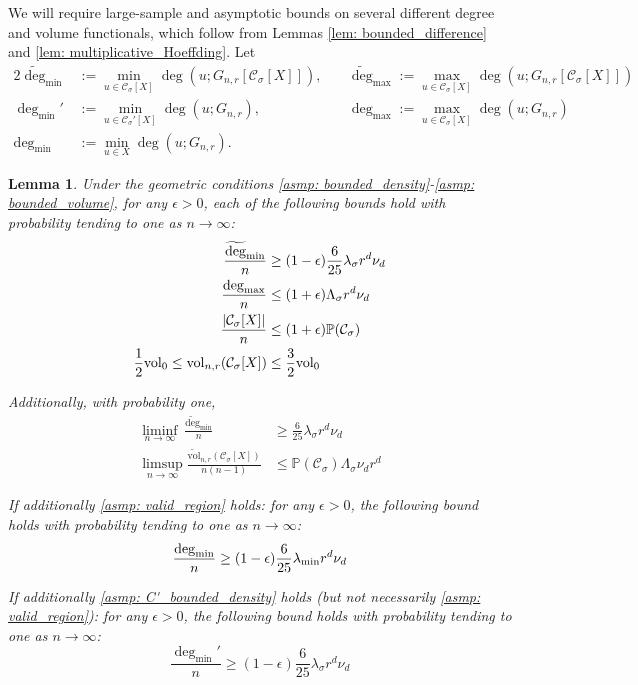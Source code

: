 \documentclass{article}
\DeclarePairedDelimiter\abs{\lvert}{\rvert}
\newcommand{\vol}{\mathrm{vol}}
\newcommand{\1}{\mathbf{1}}
\newcommand{\Xbf}{X}             %
\newcommand{\Pbb}{\mathbb{P}}
\newcommand{\Cset}{\mathcal{C}}
\newcommand{\Csig}{\Cset_{\sigma}}
\newcommand{\degminpr}{\deg_{\min}'}
\newcommand{\degminwt}{\widetilde{\deg}_{\min}}
\newcommand{\degmaxwt}{\widetilde{\deg}_{\max}}
\newcommand{\degmax}{\deg_{\max}}
\newcommand{\degmin}{\deg_{\min}}
\theoremstyle{aldenthm}
\newtheorem{lemma}{Lemma}
\theoremstyle{aldenrmrk}
\begin{document}
We will require large-sample and asymptotic bounds on several different degree and volume functionals, which follow from Lemmas \ref{lem: bounded_difference} and \ref{lem: multiplicative_Hoeffding}. Let
\begin{alignat*}{2}
\degminwt & := \min_{u \in \Csig[\Xbf]} \deg(u; G_{n,r}\left[\Csig[\Xbf]\right]),~ && \degmaxwt := \max_{u \in \Csig[\Xbf]} \deg(u; G_{n,r}\left[\Csig[\Xbf]\right]) \\ 
\degminpr & := \min_{u \in \Csig'[\Xbf]} \deg(u; G_{n,r}),~ && \degmax := \max_{u \in \Csig[\Xbf]} \deg(u; G_{n,r}) \\
\degmin & := \min_{u \in \Xbf} \deg(u; G_{n,r}).
\end{alignat*}

\begin{lemma}
	\label{lem: ball_bounds_in_probability}
	Under the geometric conditions \ref{asmp: bounded_density}-\ref{asmp: bounded_volume}, for any $\epsilon > 0$, each of the following bounds hold with probability tending to one as $n \to \infty$:
	\begin{align}
	\frac{\degminwt}{n} & \geq (1 - \epsilon)\frac{6}{25} \lambda_{\sigma} r^d \nu_d \label{eqn: min_cluster_degree_bound} \\
	\frac{\degmax}{n} & \leq (1 + \epsilon)\Lambda_{\sigma} r^d \nu_d \label{eqn: max_degree_bound}\\
	\frac{\abs{\Csig[\Xbf]}}{n} & \leq (1 + \epsilon)\Pbb(\Csig) \label{eqn: Csig_cardinality_bound}\\
	\label{eqn: volwt_bound}
	\frac{1}{2}\vol_0 \leq \vol_{n,r}(\Csig[\Xbf]) & \leq \frac{3}{2} \vol_0
	\end{align}
	
	Additionally, with probability one,
	\begin{align}
	\liminf_{n \to \infty} \frac{\degminwt}{n} & \geq \frac{6}{25} \lambda_{\sigma} r^d \nu_d \label{eqn: min_cluster_degree_bound_asymp}\\
	\limsup_{n \to \infty} \frac{\widetilde{\vol}_{n,r}(\Csig[\Xbf])}{n(n-1)} & \leq \Pbb(\Csig) \Lambda_{\sigma} \nu_d r^d \label{eqn: max_vol_bound_asymp}
	\end{align}
	
	If additionally \ref{asmp: valid_region} holds: for any $\epsilon > 0$, the following bound holds with probability tending to one as $n \to \infty$:
	\begin{equation}
	\frac{\degmin}{n} \geq (1 - \epsilon)\frac{6}{25}\lambda_{\min} r^d \nu_d \label{eqn: min_degree_bound} \\
	\end{equation}
	
	If additionally \ref{asmp: C'_bounded_density} holds (but not necessarily \ref{asmp: valid_region}): for any $\epsilon > 0$, the following bound holds with probability tending to one as $n \to \infty$:
	\begin{equation}
	\label{eqn: min_cluster_degree_bound_2}
	\frac{\degminpr}{n} \geq (1 - \epsilon)\frac{6}{25} \lambda_{\sigma} r^d \nu_d
	\end{equation}
\end{lemma}
\end{document}
